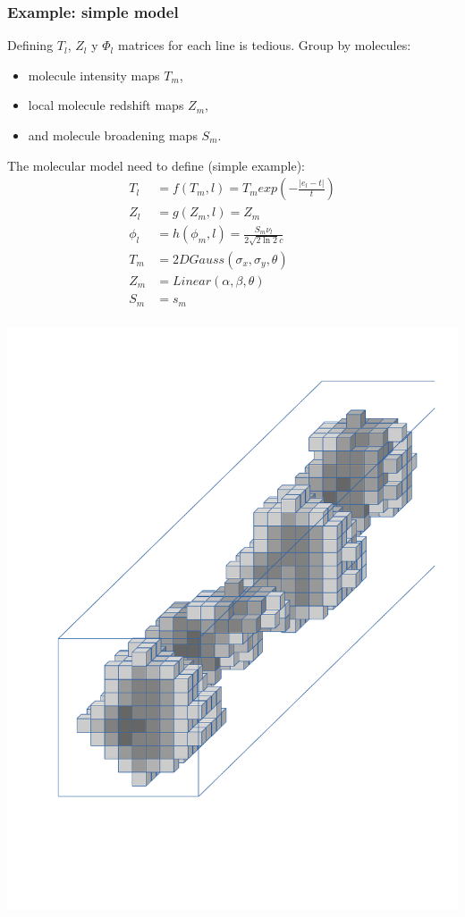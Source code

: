 \documentclass[slidestop,compress,mathserif,color,12pt]{beamer}
\begin{document}
\begin{frame}
  \frametitle{Example: simple model}
\scriptsize
Defining $T_l$, $Z_l$ y $\Phi_l$ matrices for each line is tedious.
Group by molecules: 
\begin{itemize}
 \item molecule intensity maps $T_m$,
 \item local molecule redshift maps $Z_m$,
 \item and molecule broadening maps $S_m$.
\end{itemize} 

\begin{minipage}{0.49\linewidth}
The molecular model need to define (simple example):
\begin{align*}
T_l & = f(T_m,l) = T_m exp\left(-\frac{|e_l - t|}{t}\right) \\
Z_l & = g(Z_m,l) = Z_m \\
\phi_l & = h(\phi_m,l) =  \frac{S_m \nu_l}{2\sqrt{2\ln 2} c}\\
T_m & = 2DGauss(\sigma_x,\sigma_y,\theta) \\
Z_m & = Linear(\alpha,\beta,\theta) \\
S_m & = s_m  \\
\end{align*}
\end{minipage}
\begin{minipage}{0.49\linewidth}
\centerline{\includegraphics[width=0.9\linewidth]{cube-thresh3.png}}
\end{minipage}
\end{frame}
\end{document}
